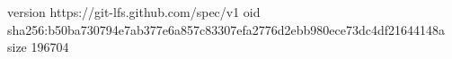 version https://git-lfs.github.com/spec/v1
oid sha256:b50ba730794e7ab377e6a857c83307efa2776d2ebb980ece73dc4df21644148a
size 196704
